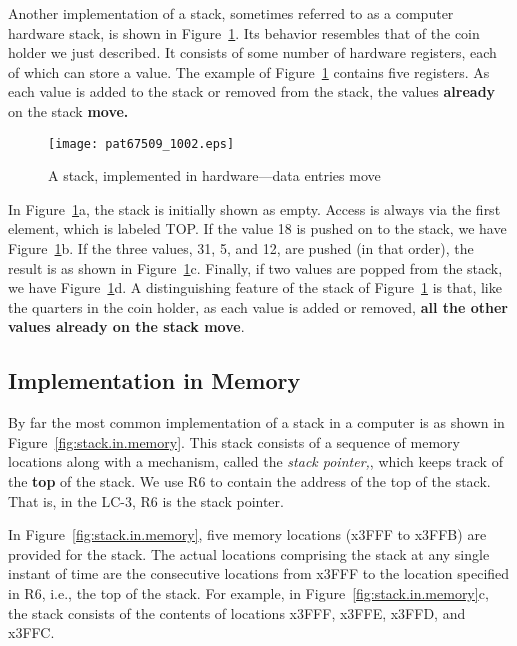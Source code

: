 \documentclass{patt}
\begin{document}
Another implementation of a stack, sometimes referred to as a computer 
hardware stack, is shown in Figure~\ref{fig:hardware.stack}. Its behavior
resembles that of the coin holder we just described. It consists of
some number of hardware registers, each of which can store a value. The
example of Figure~\ref{fig:hardware.stack} contains five registers. As
each value is added to the stack or removed from the stack, the
values {\bf already} on the stack {\bf move.}

\begin{figure}[h]
\centerline{\texttt{[image: pat67509\_1002.eps]}}
\caption{A stack, implemented in hardware---data
entries move}
\label{fig:hardware.stack}
\end{figure}

In Figure~\ref{fig:hardware.stack}a, the stack is initially shown as
empty. Access is always via the first element, which is labeled
{\footnotesize{TOP}}.  If the value 18 is pushed on to the stack, we
have Figure~\ref{fig:hardware.stack}b. If the three values, 31, 5, and
12, are pushed (in that order), the result is as shown in 
Figure~\ref{fig:hardware.stack}c. Finally, if two values are popped
from the stack, we have Figure~\ref{fig:hardware.stack}d.  A distinguishing 
feature of the stack of Figure~\ref{fig:hardware.stack} is that, like the 
quarters in the coin holder, as each value is added or removed, {\bf all the 
other values already on the stack move}.

\subsection{Implementation in Memory}

By far the most common implementation of a stack in a computer is as
shown in Figure~\ref{fig:stack.in.memory}. This stack consists of a
sequence of memory locations along with a mechanism, called the {\em
stack pointer,},  which keeps track of the {\bf top} 
of the stack.  We use R6 to contain the address of the top of the stack.  
That is, in the LC-3, R6 is the stack pointer.  

In Figure~\ref{fig:stack.in.memory}, five memory locations (x3FFF to x3FFB) 
are provided for the stack.  The actual locations comprising the stack at any 
single instant of time are the consecutive locations from x3FFF to the location 
specified in R6, i.e., the top of the stack.  For example, in 
Figure~\ref{fig:stack.in.memory}c, the stack consists of the contents of 
locations x3FFF, x3FFE, x3FFD, and x3FFC.
\end{document}

